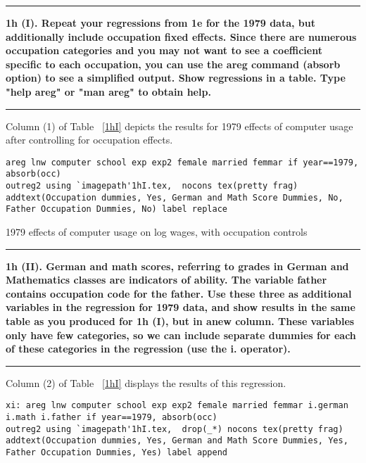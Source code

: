 \documentclass[12pt]{article}
\newcommand\question[1]{\vspace{1em}\hrule\vspace{1em}\textbf{#1}\vspace{1em}\hrule\vspace{1em}}
\begin{document}
\newpage
\question{1h (I). Repeat your regressions from 1e for the 1979 data, but additionally include occupation fixed effects. Since there are numerous occupation categories and you may not want to see a coefficient specific to each occupation, you can use the areg command (absorb option) to see a simplified output. Show regressions in a table. Type "help areg" or "man areg" to obtain help.}
Column (1) of Table ~\ref{1hI} depicts the results for 1979 effects of computer usage after controlling for occupation effects.

\begin{lstlisting}
areg lnw computer school exp exp2 female married femmar if year==1979, absorb(occ)
outreg2 using `imagepath'1hI.tex,  nocons tex(pretty frag) addtext(Occupation dummies, Yes, German and Math Score Dummies, No, Father Occupation Dummies, No) label replace
\end{lstlisting}

\begin{table}
\caption{1979 effects of computer usage on log wages, with occupation controls}

\label{1hI}
\end{table}

\question{1h (II). German and math scores, referring to grades in German and Mathematics classes are indicators of ability. The variable father contains occupation code for the father. Use these three as additional variables in the regression for 1979 data, and show results in the same table as you produced for 1h (I), but in anew column. These variables only have few categories, so we can include separate dummies for each of these categories in the regression (use the i. operator).}
Column (2) of Table ~\ref{1hI} displays the results of this regression.

\begin{lstlisting}
xi: areg lnw computer school exp exp2 female married femmar i.german i.math i.father if year==1979, absorb(occ)
outreg2 using `imagepath'1hI.tex,  drop(_*) nocons tex(pretty frag) addtext(Occupation dummies, Yes, German and Math Score Dummies, Yes, Father Occupation Dummies, Yes) label append
\end{lstlisting}
\end{document}
